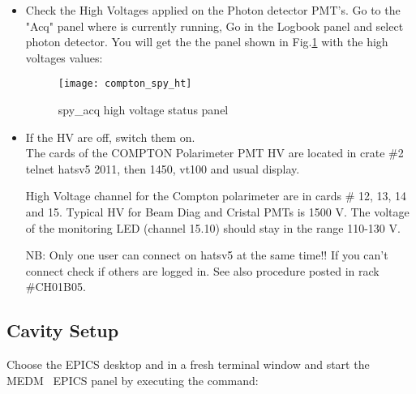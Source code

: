 {{\begin{itemize}
In a fresh terminal window, execute the command to start 
the spy acquisition control panels\\

\\

Don't be surprised. 7 windows will be open but regroup in only one
        within few seconds. From time to time, it may happen that one window
        does not go inside  window. Click on the corresponding widget.

\item Check the High Voltages applied on the Photon detector PMT's.
Go to the "Acq" panel where  is currently running,
Go in the Logbook panel and select photon detector. You will get the 
the  panel shown in Fig.\ref{fig:compton_spy_ht} with the high voltages values:
\begin{figure}[htp]
    \begin{center}
        \texttt{[image: compton\_spy\_ht]}
    \end{center}
    \caption[compton:spy\_acq high voltage]{spy\_acq high voltage status panel }
    \label{fig:compton_spy_ht}
\end{figure}

\item If the HV are off, switch them on.\\
The cards of the COMPTON Polarimeter PMT HV are located in crate \#2
telnet hatsv5 2011, then 1450, vt100 and usual display.

High Voltage channel for the Compton polarimeter are in cards \# 12, 13, 14 and 15.
Typical HV for Beam Diag and Cristal PMTs is 1500 V. The voltage of the monitoring
LED (channel 15.10) should stay in the range 110-130 V.

\par NB: Only one user can connect on hatsv5 at the same time!! If you can't connect
check if others are logged in. See also procedure posted in rack \#CH01B05.
\end{itemize}

\newpage
\subsection{Cavity Setup}
Choose the EPICS desktop and in a fresh terminal window and start the MEDM~\cite{MEDMwww} EPICS panel 
 by executing  the command:\\

\\

}}
